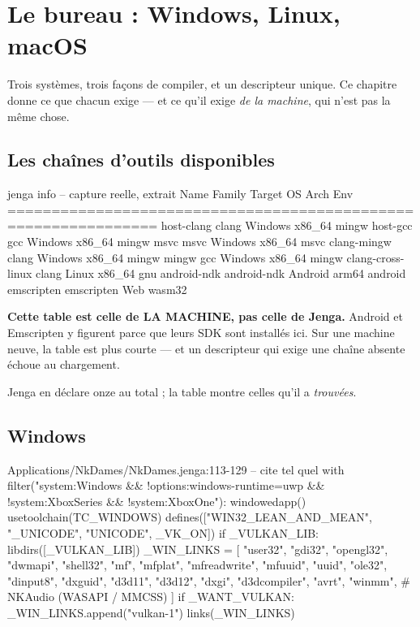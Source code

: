 \chapter{Le bureau : Windows, Linux, macOS}

Trois systèmes, trois façons de compiler, et un descripteur unique. Ce chapitre
donne ce que chacun exige --- et ce qu'il exige \emph{de la machine}, qui n'est
pas la même chose.

\section{Les chaînes d'outils disponibles}

\begin{nkcode}{jenga info -- capture reelle, extrait}
Name                 Family        Target OS   Arch     Env
===============================================================
host-clang           clang         Windows     x86_64   mingw
host-gcc             gcc           Windows     x86_64   mingw
msvc                 msvc          Windows     x86_64   msvc
clang-mingw          clang         Windows     x86_64   mingw
mingw                gcc           Windows     x86_64   mingw
clang-cross-linux    clang         Linux       x86_64   gnu
android-ndk          android-ndk   Android     arm64    android
emscripten           emscripten    Web         wasm32
\end{nkcode}

\begin{nkretenir}
\textbf{Cette table est celle de LA MACHINE, pas celle de Jenga.} Android et
Emscripten y figurent parce que leurs SDK sont installés ici. Sur une machine
neuve, la table est plus courte --- et un descripteur qui exige une chaîne
absente échoue au chargement.

Jenga en déclare onze au total ; la table montre celles qu'il a \emph{trouvées}.
\end{nkretenir}

\section{Windows}

\begin{nkcode}{Applications/NkDames/NkDames.jenga:113-129 -- cite tel quel}
with filter("system:Windows && !options:windows-runtime=uwp && !system:XboxSeries && !system:XboxOne"):
    windowedapp()
    usetoolchain(TC_WINDOWS)
    defines(["WIN32_LEAN_AND_MEAN", "_UNICODE", "UNICODE", _VK_ON])
    if _VULKAN_LIB:
        libdirs([_VULKAN_LIB])
    _WIN_LINKS = [
        "user32", "gdi32", "opengl32", "dwmapi", "shell32",
        "mf", "mfplat", "mfreadwrite", "mfuuid",
        "uuid", "ole32", "dinput8", "dxguid",
        "d3d11", "d3d12", "dxgi", "d3dcompiler",
        "avrt", "winmm",   # NKAudio (WASAPI / MMCSS)
    ]
    if _WANT_VULKAN:
        _WIN_LINKS.append("vulkan-1")
    links(_WIN_LINKS)
\end{nkcode}


